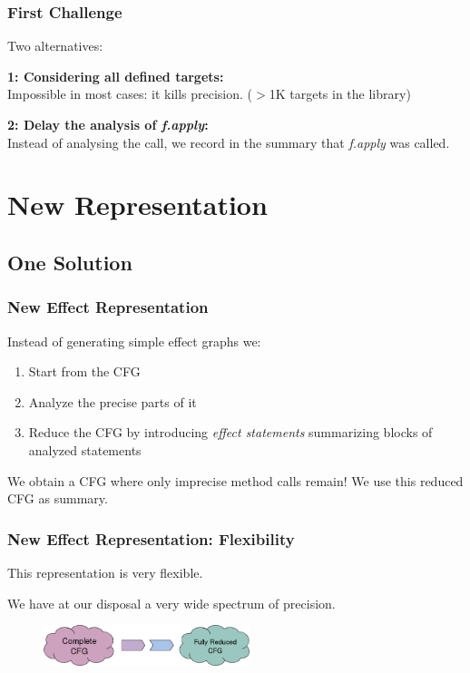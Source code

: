 \documentclass[hyperref={pdfpagelabels=false}]{beamer}
\begin{document}
\begin{frame}[fragile]
\frametitle{First Challenge}
    Two alternatives: 
    \vspace{15pt}

    \textbf{1: Considering all defined targets:}\\
    \vspace{5pt}
    Impossible in most cases: it kills precision.
    ($>$1K targets in the library)

    \vspace{15pt}
    \pause

    \textbf{2: Delay the analysis of \emph{f.apply}:}\\
    \vspace{5pt}
    Instead of analysing the call, we record in the summary that \emph{f.apply}
    was called.

\end{frame}


\section{New Representation}
\subsection{One Solution}
\begin{frame}[fragile]
\frametitle{New Effect Representation}
    Instead of generating simple effect graphs we:
    \begin{enumerate}
        \item Start from the CFG
        \item Analyze the precise parts of it
        \item Reduce the CFG by introducing \emph{effect statements} summarizing
        blocks of analyzed statements
    \end{enumerate}

    \vspace{15pt}
    \pause

    We obtain a CFG where only imprecise method calls remain! We use this
    reduced CFG as summary.

\end{frame}

\begin{frame}[fragile]
\frametitle{New Effect Representation: Flexibility}
    This representation is very flexible.

    We have at our disposal a very wide spectrum of precision.

    \vspace{15pt}

    \begin{figure}[t]
      \begin{center}
      \includegraphics[width=60mm]{images/spectrum.png}\\
      \end{center}
    \end{figure}
\end{frame}
\end{document}
